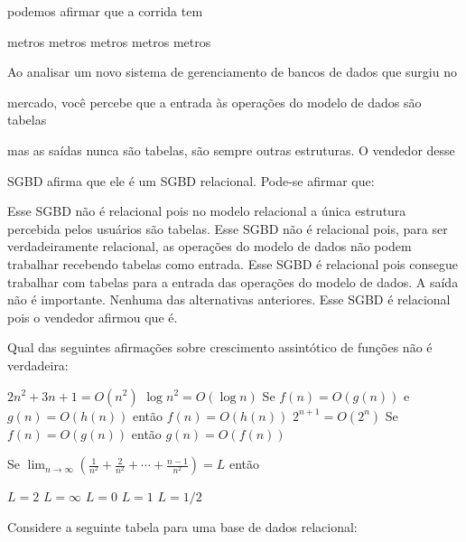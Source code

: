 \documentclass[12pt, addpoints]{exam}
\begin{document}
\begin{questions}
podemos afirmar que a corrida tem
\begin{choices}
 metros
 metros
 metros
 metros
 metros
\end{choices}

\question

Ao analisar um novo sistema de gerenciamento de bancos de dados que surgiu no

mercado, você percebe que a entrada às operações do modelo de dados são tabelas

mas as saídas nunca são tabelas, são sempre outras estruturas. O vendedor desse

SGBD afirma que ele é um SGBD relacional. Pode-se afirmar que:


\begin{choices}
\choice Esse SGBD não é relacional pois no modelo relacional a única estrutura percebida pelos usuários são tabelas.
\choice Esse SGBD não é relacional pois, para ser verdadeiramente relacional, as operações do modelo de dados não podem trabalhar recebendo tabelas como entrada.
\choice Esse SGBD é relacional pois consegue trabalhar com tabelas para a entrada das operações do modelo de dados. A saída não é importante.
\choice Nenhuma das alternativas anteriores.
\choice Esse SGBD é relacional pois o vendedor afirmou que é.
\end{choices}

\question

Qual das seguintes afirmações sobre crescimento assintótico de funções não é verdadeira:
\begin{choices}
\choice \( 2n^2 + 3n + 1 = O(n^2) \)
\choice \( \log n^2 = O(\log n) \)
\choice Se \( f(n) = O(g(n)) \) e \( g(n) = O(h(n)) \) então \( f(n) = O(h(n)) \)
\choice \( 2^{n+1} = O(2^n) \)
\choice Se \( f(n) = O(g(n)) \) então \( g(n) = O(f(n)) \)
\end{choices}

\question

Se \( \lim_{n \to \infty} \left( \frac{1}{n^2} + \frac{2}{n^2} + \cdots + \frac{n-1}{n^2} \right) = L \) então


\begin{choices}
\choice \( L = 2 \)
\choice \( L = \infty \)
\choice \( L = 0 \)
\choice \( L = 1 \)
\choice \( L = 1/2 \)
\end{choices}

\question

Considere a seguinte tabela para uma base de dados relacional:\\


\end{questions}
\end{document}
